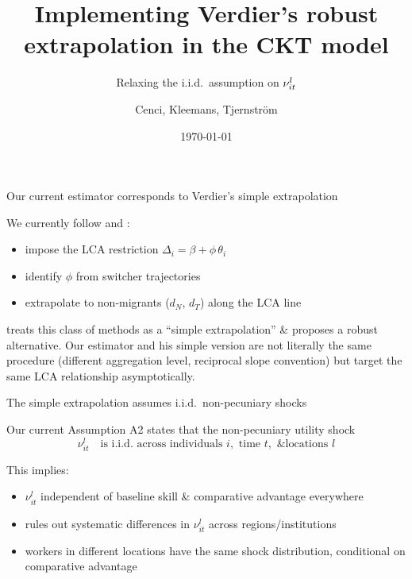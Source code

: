 \documentclass[10pt,aspectratio=169]{beamer}
\title{Implementing Verdier's robust extrapolation in the CKT model}
\subtitle{Relaxing the i.i.d.\ assumption on $\nuil$}
\author{Cenci, Kleemans, Tjernstr\"om}
\date{\today}
\newcommand{\thetai}{\theta_{i}}
\newcommand{\Deltai}{\Delta_{i}}
\newcommand{\phicoef}{\phi}
\newcommand{\dN}{d_{N}}
\newcommand{\dT}{d_{T}}
\newcommand{\nuil}{\nu_{it}^{l}}
\begin{document}
\begin{frame}[plain]
  \titlepage
\end{frame}

\begin{frame}{Our current estimator corresponds to Verdier's simple extrapolation}

  We currently follow \citet{suriSelectionComparativeAdvantage2011} and \citet{tjernstromCommentSuri2011}:
  \begin{itemize}
    \item impose the LCA restriction $\Deltai = \beta + \phicoef\, \thetai$
    \item identify $\phicoef$ from switcher trajectories
    \item extrapolate to non-migrants ($\dN$, $\dT$) along the LCA line
  \end{itemize}

  \vspace{0.8em}
  \citet{verdierAverageTreatmentEffects2020a} treats this class of methods as a ``simple extrapolation'' \& proposes a robust alternative.
  Our estimator and his simple version are not literally the same procedure (different aggregation level, reciprocal slope convention) but target the same LCA relationship asymptotically.

\end{frame}

\begin{frame}{The simple extrapolation assumes i.i.d.\ non-pecuniary shocks}

  Our current Assumption A2 states that the non-pecuniary utility shock
  \[
    \nuil \quad \text{is i.i.d.\ across individuals } i, \text{ time } t, \text{ \& locations } l
  \]

  \vspace{0.6em}
  This implies:
  \begin{itemize}
    \item $\nuil$ independent of baseline skill \& comparative advantage \alert{everywhere}
    \item rules out systematic differences in $\nuil$ across regions/institutions
    \item workers in different locations have the same shock distribution, conditional on comparative advantage
  \end{itemize}

\end{frame}
\end{document}
